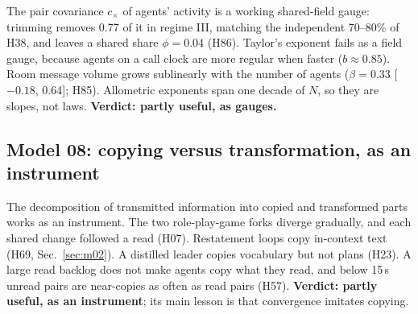 The pair covariance $c_\times$ of agents' activity is a working shared-field gauge: trimming removes 0.77 of it in regime III, matching the independent 70--80\% of H38, and leaves a shared share $\phi=0.04$ (H86). Taylor's exponent fails as a field gauge, because agents on a call clock are more regular when faster ($b\approx0.85$). Room message volume grows sublinearly with the number of agents ($\beta=0.33$ [$-0.18$, 0.64]; H85). Allometric exponents span one decade of $N$, so they are slopes, not laws. \textbf{Verdict: partly useful, as gauges.}

\subsection{Model 08: copying versus transformation, as an instrument}\label{sec:m08}

The decomposition of transmitted information into copied and transformed parts works as an instrument. The two role-play-game forks diverge gradually, and each shared change followed a read (H07). Restatement loops copy in-context text (H69, Sec.~\ref{sec:m02}). A distilled leader copies vocabulary but not plans (H23). A large read backlog does not make agents copy what they read, and below 15\,s unread pairs are near-copies as often as read pairs (H57). \textbf{Verdict: partly useful, as an instrument}; its main lesson is that convergence imitates copying.
